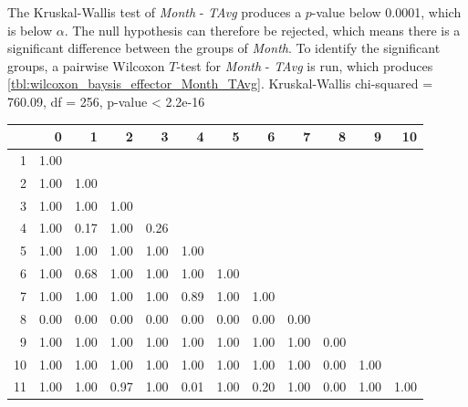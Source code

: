 
The Kruskal-Wallis test of \textit{Month} - \textit{TAvg} produces a $p$-value below 0.0001, which is below $\alpha$. The null hypothesis can therefore be rejected, which means there is a significant difference between the groups of \textit{Month}. To identify the significant groups, a pairwise Wilcoxon $T$-test for \textit{Month} - \textit{TAvg} is run, which produces \cref{tbl:wilcoxon_baysis_effector_Month_TAvg}. 
Kruskal-Wallis chi-squared = 760.09, df = 256, p-value < 2.2e-16

\begin{tabular}{rrrrrrrrrrrr}
  \hline
 & 0 & 1 & 2 & 3 & 4 & 5 & 6 & 7 & 8 & 9 & 10 \\ 
  \hline
1 & 1.00 &  &  &  &  &  &  &  &  &  &  \\ 
  2 & 1.00 & 1.00 &  &  &  &  &  &  &  &  &  \\ 
  3 & 1.00 & 1.00 & 1.00 &  &  &  &  &  &  &  &  \\ 
  4 & 1.00 & 0.17 & 1.00 & 0.26 &  &  &  &  &  &  &  \\ 
  5 & 1.00 & 1.00 & 1.00 & 1.00 & 1.00 &  &  &  &  &  &  \\ 
  6 & 1.00 & 0.68 & 1.00 & 1.00 & 1.00 & 1.00 &  &  &  &  &  \\ 
  7 & 1.00 & 1.00 & 1.00 & 1.00 & 0.89 & 1.00 & 1.00 &  &  &  &  \\ 
  8 & 0.00 & 0.00 & 0.00 & 0.00 & 0.00 & 0.00 & 0.00 & 0.00 &  &  &  \\ 
  9 & 1.00 & 1.00 & 1.00 & 1.00 & 1.00 & 1.00 & 1.00 & 1.00 & 0.00 &  &  \\ 
  10 & 1.00 & 1.00 & 1.00 & 1.00 & 1.00 & 1.00 & 1.00 & 1.00 & 0.00 & 1.00 &  \\ 
  11 & 1.00 & 1.00 & 0.97 & 1.00 & 0.01 & 1.00 & 0.20 & 1.00 & 0.00 & 1.00 & 1.00 \\ 
   \hline
\end{tabular}

